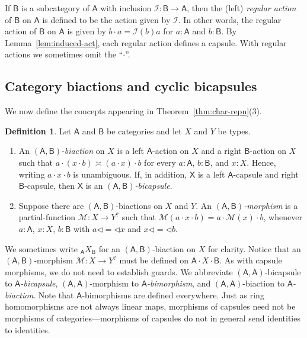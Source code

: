 \documentclass{amsart}
\newcommand{\tin}{:}
\newcommand{\Cat}[1]{\mathsf{#1}}
\newcommand{\cat}[1]{\Cat{#1}}
\newcommand{\acat}[1]{\mathsf{#1}}
\newcommand{\Caps}[1]{\mathsf{#1}}
\numberwithin{lstfloat}{section}
\newcommand{\func}[1]{\mathcal{#1}}
\newcommand{\fM}{\func{M}}
\newcommand{\cA}{\cat{A}}
\newcommand{\cB}{\cat{B}}
\newcommand{\aX}{\Caps{X}}
\newenvironment{ithm}{\begin{enumerate}[label={\rm(\alph*)}, ref=(\alph*),
      labelwidth=18pt, leftmargin=18pt, topsep=3pt, itemsep=1pt, parsep=2pt]}
      {\end{enumerate}}
\theoremstyle{definition}
\newtheorem{defn}[thm]{Definition}
\theoremstyle{remark}
\numberwithin{equation}{section}
\begin{document}
If $\acat{B}$ is a subcategory of $\acat{A}$ with inclusion $\func{I} :
\acat{B}\to\acat{A}$, then the (left) \emph{regular action} of $\acat{B}$ on
$\acat{A}$ is defined to be the action given by $\func{I}$. In other words, the regular action
of $\acat{B}$ on $\acat{A}$ is given by $b\cdot a = \func{I}(b)a$ for
$a:\acat{A}$ and $b:\acat{B}$. By Lemma~\ref{lem:induced-act}, each regular
action defines a capsule.  With regular actions we sometimes omit the ``$\cdot$''.


\subsection{Category biactions and cyclic bicapsules}\label{sec:cat-biacts}

We now define the concepts appearing in Theorem~\ref{thm:char-repn}(3).

\begin{defn}\label{defn:bi-action}
  Let $\cA$ and $\cB$ be categories and let $X$ and $Y$ be types.
  \begin{ithm}
  \item An $(\cA,\cB)$-\emph{biaction} on $X$ is a left $\cA$-action on $X$
  and a right $\acat{B}$-action on $X$ such that $a\cdot (x\cdot b) \asymp
  (a\cdot x)\cdot b$ for every  $a\tin\cA$, $b\tin\cB$, and $x\tin X$. Hence,
  writing $a\cdot x\cdot b$ is unambiguous. If, in addition, $\aX$ is a left
  $\cA$-capsule and right $\cB$-capsule, then $\aX$ is an
  \emph{$(\cA,\cB)$-bicapsule}.

  \item Suppose there are $(\cA,\cB)$-biactions on $X$ and $Y$. An
  \emph{$(\cA,\cB)$-morphism} is a partial-function $\fM:X\to Y^?$ such that
  $\fM(a\cdot x\cdot b) = a\cdot \fM(x) \cdot b$, whenever
  $a:\cA$, $x:X$, $b:\cB$ with $a\lhd=\lhd x$ and $x\lhd=\lhd b$.
  \end{ithm}
\end{defn}

We sometimes write ${_{\cA}X_{\cB}}$ for an $(\cA,\cB)$-biaction on $X$ for
clarity.  Notice that an $(\cA,\cB)$-morphism $\fM:X\to Y^?$ must be defined on
$\cA\cdot X\cdot \cB$. As with capsule morphisms, we do not need to establish
guards. We abbreviate $(\cA,\cA)$-bicapsule to \emph{$\cA$-bicapsule},
$(\cA,\cA)$-morphism to \emph{$\cA$-bimorphism}, and $(\cA,\cA)$-biaction to
\emph{$\cA$-biaction}. Note that $\acat{A}$-bimorphisms are defined everywhere.
Just as ring homomorphisms are not always linear maps, morphisms of capsules
need not be morphisms of categories---morphisms of capsules do not in general
send identities to identities. 
\end{document}
